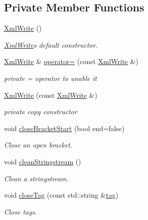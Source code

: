 \subsection*{Private Member Functions}
\begin{DoxyCompactItemize}
\item 
\hyperlink{class_xml_write_a672ade162809016f848aeb94089971bc}{Xml\+Write} ()
\begin{DoxyCompactList}\small\item\em \hyperlink{class_xml_write}{Xml\+Write}\textquotesingle{}s default constructor. \end{DoxyCompactList}\item 
\hyperlink{class_xml_write}{Xml\+Write} \& \hyperlink{class_xml_write_ae5b1e0e3d651fb90ace17452e3c746e5}{operator=} (const \hyperlink{class_xml_write}{Xml\+Write} \&)
\begin{DoxyCompactList}\small\item\em private = operator to unable it \end{DoxyCompactList}\item 
\hyperlink{class_xml_write_a7136893aea6b0cda898fcd7b4d7c9cf0}{Xml\+Write} (const \hyperlink{class_xml_write}{Xml\+Write} \&)
\begin{DoxyCompactList}\small\item\em private copy constructor \end{DoxyCompactList}\item 
void \hyperlink{class_xml_write_ab6282860f4918e95409c27210a465554}{close\+Bracket\+Start} (bool end=false)
\begin{DoxyCompactList}\small\item\em Close an open bracket. \end{DoxyCompactList}\item 
void \hyperlink{class_xml_write_a4b36555dcd80b43e31d54d54a673c6d9}{clean\+Stringstream} ()
\begin{DoxyCompactList}\small\item\em Clean a stringstream. \end{DoxyCompactList}\item 
void \hyperlink{class_xml_write_af146f5cdcd5c931f8a975c3a4b25fc22}{close\+Tag} (const std\+::string \&\hyperlink{_xml_write_8hpp_a60cbdc53b290e261cd21789056f81b59}{tag})
\begin{DoxyCompactList}\small\item\em Close tags. \end{DoxyCompactList}\end{DoxyCompactItemize}
